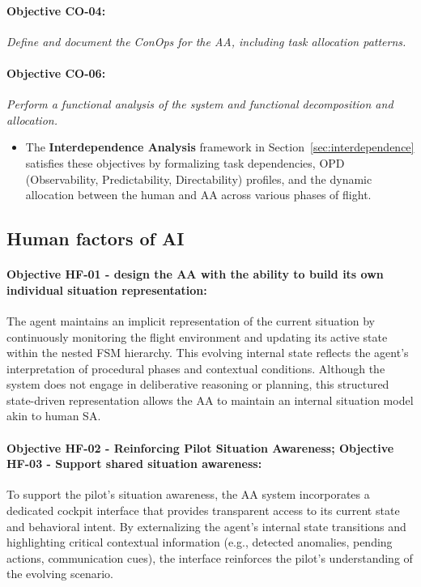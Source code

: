 \documentclass[12pt,a4paper]{article} %
\begin{document}
	\paragraph{Objective CO-04:} \textit{Define and document the ConOps for the AA, including task allocation patterns.}
	
	\paragraph{Objective CO-06:} \textit{Perform a functional analysis of the system and functional decomposition and allocation.}
	
	\begin{itemize}
	  \item The \textbf{Interdependence Analysis} framework in Section~\ref{sec:interdependence} satisfies these objectives by formalizing task dependencies, OPD (Observability, Predictability, Directability) profiles, and the dynamic allocation between the human and AA across various phases of flight.
	\end{itemize}

	\subsection*{Human factors of AI}
	
	\paragraph{Objective HF-01 - design the AA with the ability to build its own individual situation representation:}
	The agent maintains an implicit representation of the current situation by continuously monitoring the flight environment and updating its active state within the nested FSM hierarchy. This evolving internal state reflects the agent's interpretation of procedural phases and contextual conditions. Although the system does not engage in deliberative reasoning or planning, this structured state-driven representation allows the AA to maintain an internal situation model akin to human SA.

	\paragraph{Objective HF-02 - Reinforcing Pilot Situation Awareness; Objective HF-03 - Support shared situation awareness:}  
	To support the pilot's situation awareness, the AA system incorporates a dedicated cockpit interface that provides transparent access to its current state and behavioral intent. By externalizing the agent's internal state transitions and highlighting critical contextual information (e.g., detected anomalies, pending actions, communication cues), the interface reinforces the pilot's understanding of the evolving scenario. 
\end{document}
